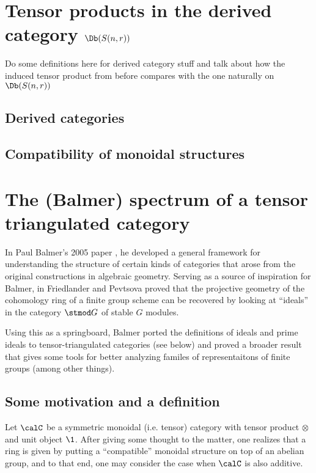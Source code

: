 \documentclass[12pt]{article}
\begin{document}
\newpage
\section{Tensor products in the derived category \texorpdfstring{$\Db(S(n,r))$}{DbS(n,r)}}
{\color{red} Do some definitions here for derived category stuff and talk about how the induced tensor product from before compares with the one 
naturally on $\Db(S(n,r))$}
\subsection{Derived categories}

\subsection{Compatibility of monoidal structures}

\newpage
\section{The (Balmer) spectrum of a tensor triangulated category}
In Paul Balmer's 2005 paper \cite{balmer-spc}, he developed a general framework for understanding the structure of certain 
kinds of categories that arose from the original constructions in algebraic geometry. Serving as a source of inspiration for Balmer, in \cite{friedlander-pevtsova-pi} Friedlander and Pevtsova proved
that the projective geometry of the cohomology ring of a finite group scheme can be recovered by looking at ``ideals'' in the category $\stmod G$ 
of stable $G$ modules.

Using this as a springboard, Balmer ported the definitions of ideals and prime ideals to tensor-triangulated categories (see below)
and proved a broader result that gives some tools for better analyzing familes of representaitons of finite groups (among other things).
\subsection{Some motivation and a definition}
Let $\calC$ be a symmetric monoidal (i.e. tensor) category with tensor product $\otimes$ and unit object $\1$. After giving some 
thought to the matter, one realizes that a ring is given by putting a ``compatible'' monoidal structure on top of an abelian group,
and to that end, one may consider the case when $\calC$ is also additive. 
\end{document}
